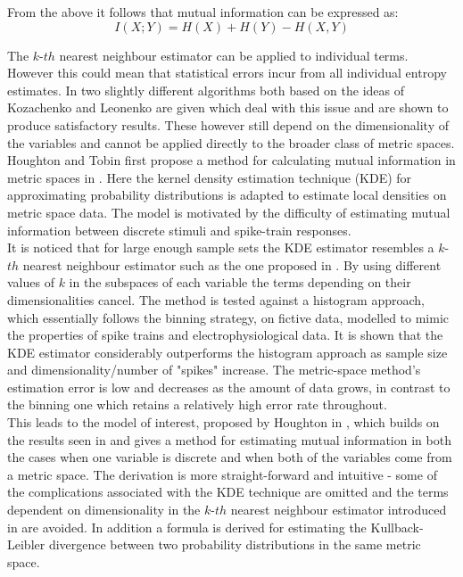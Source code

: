 \documentclass[12pt]{extarticle}
\begin{document}
\noindent
From the above it follows that mutual information can be expressed as:
\begin{equation}
I(X;Y) = H(X) + H(Y) - H(X,Y)
\end{equation}

\noindent
The $k$-$th$ nearest neighbour estimator can be applied to individual terms. However this could mean that statistical errors incur from all individual entropy estimates. In \cite{KRAS} two slightly different algorithms both based on the ideas of Kozachenko and Leonenko are given which deal with this issue and are shown to produce satisfactory results. These however still depend on the dimensionality of the variables and cannot be applied directly to the broader class of metric spaces.\\

\noindent
Houghton and Tobin first propose a method for calculating mutual information in metric spaces in \cite{HC13}. Here the kernel density estimation technique (KDE) for approximating probability distributions is adapted to estimate local densities on metric space data. The model is motivated by the difficulty of estimating mutual information between discrete stimuli and spike-train responses.\\

\noindent 
It is noticed that for large enough sample sets the KDE estimator resembles a $k$-$th$ nearest neighbour estimator such as the one proposed in \cite{KRAS}. By using different values of $k$ in the subspaces of each variable the terms depending on their dimensionalities cancel. The method is tested against a histogram approach, which essentially follows the binning strategy, on fictive data, modelled to mimic the properties of spike trains and electrophysiological data. It is shown that the KDE estimator considerably outperforms the histogram approach as sample size and dimensionality/number of "spikes" increase. The metric-space method's estimation error is low and decreases as the amount of data grows, in contrast to the binning one which retains a relatively high error rate throughout.\\

\noindent
This leads to the model of interest, proposed by Houghton in \cite{HC14}, which builds on the results seen in \cite{HC13} and gives a method for estimating mutual information in both the cases when one variable is discrete and when both of the variables come from a metric space. The derivation is more straight-forward and intuitive - some of the complications associated with the KDE technique are omitted and the terms dependent on dimensionality in the $k$-$th$ nearest neighbour estimator introduced in \cite{KRAS} are avoided. In addition a formula is derived for estimating the Kullback-Leibler divergence between two probability distributions in the same metric space.\\
\end{document}
